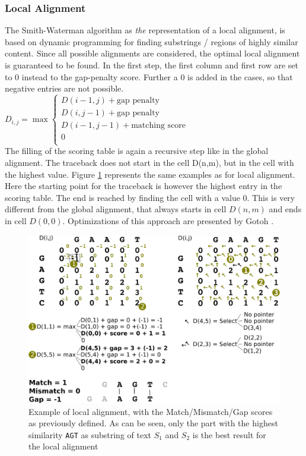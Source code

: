 \subsubsection{Local Alignment} \label{localAl}
The Smith-Waterman algorithm \cite{Smith1981} as \textit{the} representation of a local alignment, is based on dynamic programming for finding substrings / regions of highly similar content. Since all possible alignments are considered, the optimal local alignment is guaranteed to be found. In the first step, the first column and first row are set to 0 instead to the gap-penalty score. Further a $0$ is added in the cases, so that negative entries are not possible. 
$ D_{i,j} = \max
  \begin{cases}
    D(i-1,j)+ \text{gap penalty}      \\
    D(i,j-1)+ \text{gap penalty} \\
    D(i-1,j-1)+ \text{matching score} \\
    0 \\
  \end{cases}
$\\
The filling of the scoring table is again a recursive step like in the global alignment. The traceback does not start in the cell D(n,m), but in the cell with the highest value. Figure \ref{fig:local} represents the same examples as for local alignment. Here the starting point for the traceback is however the highest entry in the scoring table. The end is reached by finding the cell with a value 0. This is very different from the global alignment, that always starts in cell $D(n,m)$ and ends in cell $D(0,0)$. Optimizations of this approach are presented by Gotoh \cite{Gotoh1982}.  
\begin{figure}[H]
\label{fig:local}
    \centering
    \includegraphics[width=1\textwidth]{images/localAlign.png}
    \caption[Example of local alignment]{Example of local alignment, with the Match/Mismatch/Gap scores as previously defined. As can be seen, only the part with the highest similarity \texttt{AGT} as substring of text $S_1$ and $S_2$ is the best result for the local alignment}
\end{figure}
